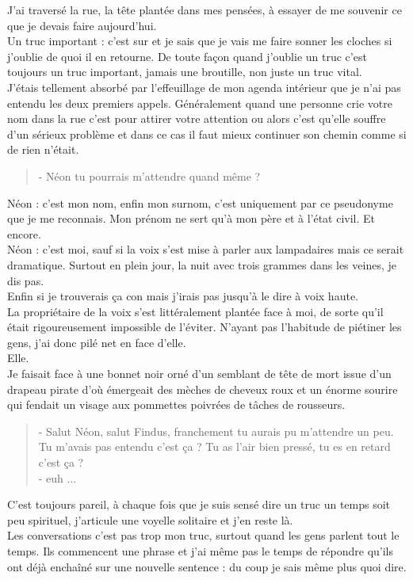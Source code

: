 J'ai traversé la rue, la tête plantée dans mes pensées, à essayer de me souvenir ce que je devais faire aujourd'hui. \\
Un truc important : c'est sur et je sais que je vais me faire sonner les cloches si j'oublie de quoi il en retourne. De toute façon quand j'oublie un truc c'est toujours un truc important, jamais une broutille, non juste un truc vital. \\

J'étais tellement absorbé par l’effeuillage de mon agenda intérieur que je n'ai pas entendu les deux premiers appels. Généralement quand une personne crie votre nom dans la rue c'est pour attirer votre attention ou alors c'est qu'elle souffre d'un sérieux problème et dans ce cas il faut mieux continuer son chemin comme si de rien n'était. \\

\begin{quote}
- Néon tu pourrais m'attendre quand même ? \\
\end{quote}

Néon : c'est mon nom, enfin mon surnom, c'est uniquement par ce pseudonyme que je me reconnais. Mon prénom ne sert qu'à mon père et à l'état civil. Et encore. \\
Néon : c'est moi, sauf si la voix s'est mise à parler aux lampadaires mais ce serait dramatique. Surtout en plein jour, la nuit avec trois grammes dans les veines, je dis pas. \\
Enfin si je trouverais ça con mais j'irais pas jusqu'à le dire à voix haute. \\

La propriétaire de la voix s'est littéralement plantée face à moi, de sorte qu'il était rigoureusement impossible de l'éviter. N'ayant pas l'habitude de piétiner les gens, j'ai donc pilé net en face d'elle. \\
Elle.\\
Je faisait face à une bonnet noir orné d'un semblant de tête de mort issue d'un drapeau pirate d'où émergeait des mèches de cheveux roux et un énorme sourire qui fendait un visage aux pommettes poivrées de tâches de rousseurs. \\

\begin{quote}
- Salut Néon, salut Findus, franchement tu aurais pu m'attendre un peu. Tu m'avais pas entendu c'est ça ? Tu as l'air bien pressé, tu es en retard c'est ça ?\\
- euh ...
\end{quote}

C'est toujours pareil, à chaque fois que je suis sensé dire un truc un temps soit peu spirituel, j'articule une voyelle solitaire et j'en reste là. \\
Les conversations c'est pas trop mon truc, surtout quand les gens parlent tout le temps. Ils commencent une phrase et j'ai même pas le temps de répondre qu'ils ont déjà enchaîné sur une nouvelle sentence : du coup je sais même plus quoi dire.